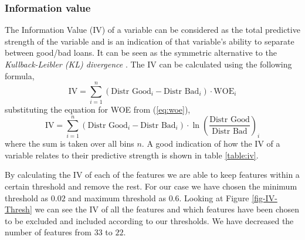 \subsubsection{Information value}
 The Information Value (IV) \cite{Siddiqi2005CreditRS} of a variable can be considered as the total predictive strength of the variable and is an indication of that variable’s ability to separate between good/bad loans. It can be seen as the symmetric alternative to the \emph{Kullback-Leibler (KL) divergence} \cite{kullback1951information}. The IV can be calculated using the following formula,
 \begin{equation}
    \mbox{IV} =  \sum^{n}_{i=1}(\mbox{Distr Good}_{i} - \mbox{Distr Bad}_{i}) \cdot \mbox{WOE}_{i}
 \end{equation}
 substituting the equation for WOE from (\ref{eq:woe}),
 \begin{equation}
     \mbox{IV} = \sum^{n}_{i=1}(\mbox{Distr Good}_{i} - \mbox{Distr Bad}_{i}) \cdot \ln{\left(\frac{\mbox{Distr Good}}{\mbox{Distr Bad}}\right)}_{i}
 \end{equation}
 where the sum is taken over all bins $n$.
 A good indication of how the IV of a variable relates to their predictive strength is shown in table \ref{table:iv}.
 \begin{table}[h!]
\begin{center}
\shadowbox{\begin{minipage}[t]{0.4\columnwidth}%
    \begin{tabular}{cl}
       \textbf{IV range}  &  \textbf{Interpretation}\\
       \hline\\
        $<0.02$ & Not predictive\\
        $[0.02,0.1)$ & Weak predictive\\
        $[0.1, 0.3)$ & Medium predictive\\
        $[0.3,0.5)$ & Strong predictive\\
        $>0.5$ & Suspicious \\
    \end{tabular}
    \end{minipage}}
\par\end{center}
\caption{IV Interpretation}\label{table:iv}
\end{table}
By calculating the IV of each of the features we are able to keep features within a certain threshold and remove the rest. For our case we have chosen the minimum threshold as $0.02$ and maximum threshold as $0.6$. Looking at Figure \ref{fig-IV-Thresh} we can see the IV of all the features and which features have been chosen to be excluded and included according to our thresholds. We have decreased the number of features from $33$ to $22$.

